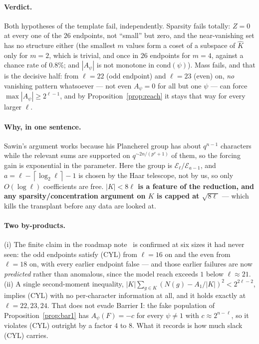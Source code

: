 \documentclass[10pt]{article}
\theoremstyle{plain}
\theoremstyle{definition}
\newcommand{\E}{\mathcal E}
\newcommand{\ceil}[1]{\left\lceil #1\right\rceil}
\begin{document}
\paragraph{Verdict.} Both hypotheses of the template fail, independently.
Sparsity fails totally: $Z=0$ at every one of the $26$ endpoints, not
``small'' but zero, and the near-vanishing set has no structure either (the
smallest $m$ values form a coset of a subspace of $\widehat K$ only for
$m=2$, which is trivial, and once in $26$ endpoints for $m=4$, against a chance
rate of $0.8\%$; and $|A_\psi|$ is not monotone in $\mathrm{cond}(\psi)$). Mass
fails, and that is the decisive half: from $\ell=22$ (odd endpoint) and
$\ell=23$ (even) on, \emph{no} vanishing pattern whatsoever --- not even
$A_\psi=0$ for all but one $\psi$ --- can force $\max|A_\psi|\ge2^{\ell-1}$, and
by Proposition~\ref{prop:reach} it stays that way for every larger $\ell$.

\paragraph{Why, in one sentence.} Sawin's argument works because his Plancherel
group has about $q^{n-1}$ characters while the relevant sums are supported on
$q^{\sim2n/(p^v+1)}$ of them, so the forcing gain is exponential in the
parameter. Here the group is $\E_\ell/\E_{a-1}$, and $a=\ell-\ceil{\log_2\ell}-1$
is chosen by the Haar telescope, not by us, so only $O(\log\ell)$ coefficients
are free. \textbf{$|K|<8\ell$ is a feature of the reduction, and any
sparsity/concentration argument on $K$ is capped at $\sqrt{8\ell}$} --- which
kills the transplant before any data are looked at.

\paragraph{Two by-products.} (i) The finite claim in the roadmap
note~\cite{roadmap} is confirmed at six sizes it had never seen: the odd
endpoints satisfy (CYL) from $\ell=16$ on and the even from $\ell=18$ on, with
every earlier endpoint false --- and those earlier failures are now
\emph{predicted} rather than anomalous, since the model reach exceeds $1$ below
$\ell\approx21$. (ii) A single second-moment inequality,
$|K|\sum_{g\in K}(N(g)-A_1/|K|)^2<2^{2\ell-2}$, implies (CYL) with no
per-character information at all, and it holds exactly at $\ell=22,23,24$. That
does not evade Barrier I: the fake population of Proposition~\ref{prop:bar1}
has $A_\psi(F)=-c$ for every $\psi\ne1$ with $c\approx2^{n-\ell}$, so it
violates (CYL) outright by a factor $4$ to $8$. What it records is how much
slack (CYL) carries.
\end{document}
